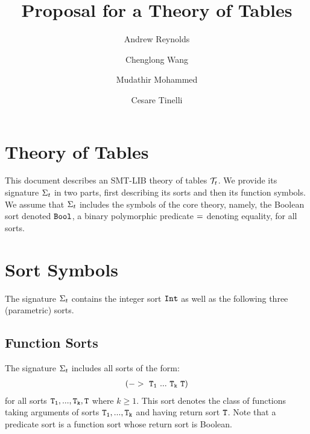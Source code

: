 \documentclass[english,a4paper,10pt]{article}
\begin{document}
\title{Proposal for a Theory of Tables}

\author{Andrew Reynolds \and Chenglong Wang \and Mudathir Mohammed \and Cesare Tinelli}

\maketitle



\section{Theory of Tables}

This document describes an SMT-LIB theory of tables $\mathcal{T}_{t}$.
We provide its signature $\Sigma_{t}$ in two parts,
first describing its sorts and then its function symbols.
We assume that $\Sigma_{t}$ includes the symbols of the core theory, 
namely, the Boolean sort denoted ${\tt Bool}$,
a binary polymorphic predicate ${\tt =}$ denoting equality, for all sorts.

\section{Sort Symbols}

The signature $\Sigma_{t}$ contains 
the integer sort ${\tt Int}$ as well as
the following three (parametric) sorts.

\subsection{Function Sorts}
The signature $\Sigma_{t}$ includes all sorts of the form:
\begin{align*}
{\tt (->\ T_1\ ...\ T_k\ T)}
\end{align*}
for all sorts ${\tt T_1, ..., T_k, T}$ where $k \geq 1$.
This sort denotes the class of functions taking arguments of sorts ${\tt T_1, ..., T_k}$
and having return sort ${\tt T}$.
Note that a predicate sort is a function sort whose return
sort is Boolean.

\begin{comment}
\paragraph{Notes}
\begin{itemize}
\item The term $\syntax{ 
(lambda\ ((x_1\ T_1)\ ...\ (x_n\ T_n))\ t)
}$
has sort 
$\syntax{(->\ T_1\ ...\ T_n\ T)}$
when $\syntax{t}$ has sort $\syntax{T}$.
\end{itemize}
\end{comment}
\end{document}
